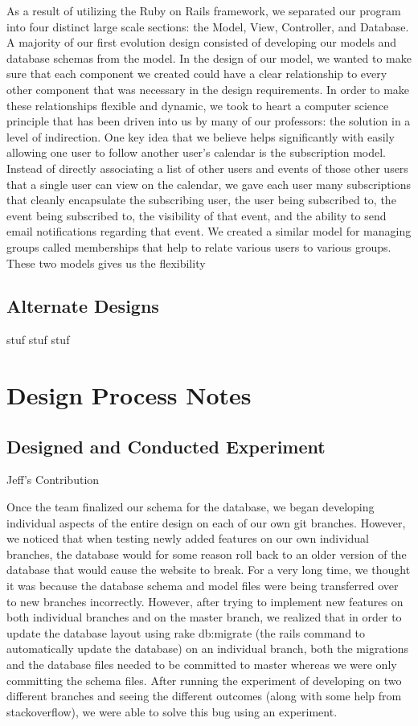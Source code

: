 \documentclass[11pt]{article}
\begin{document}
As a result of utilizing the Ruby on Rails framework, we separated our program into four distinct large scale sections: the Model, View, Controller, and Database.  A majority of our first evolution design consisted of developing our models and database schemas from the model.  In the design of our model, we wanted to make sure that each component we created could have a clear relationship to every other component that was necessary in the design requirements.  In order to make these relationships flexible and dynamic, we took to heart a computer science principle that has been driven into us by many of our professors: the solution in a level of indirection.  One key idea that we believe helps significantly with easily allowing one user to follow another user's calendar is the subscription model.  Instead of directly associating a list of other users and events of those other users that a single user can view on the calendar, we gave each user many subscriptions that cleanly encapsulate the subscribing user, the user being subscribed to, the event being subscribed to, the visibility of that event, and the ability to send email notifications regarding that event.  We created a similar model for managing groups called memberships that help to relate various users to various groups.  These two models gives us the flexibility 

\subsection{Alternate Designs}

stuf stuf stuf

\section{Design Process Notes}

\subsection{Designed and Conducted Experiment}

Jeff's Contribution

Once the team finalized our schema for the database, we began developing individual aspects of the entire design on each of our own git branches.  However, we noticed that when testing newly added features on our own individual branches, the database would for some reason roll back to an older version of the database that would cause the website to break.  For a very long time, we thought it was because the database schema and model files were being transferred over to new branches incorrectly.  However, after trying to implement new features on both individual branches and on the master branch, we realized that in order to update the database layout using rake db:migrate (the rails command to automatically update the database) on an individual branch, both the migrations and the database files needed to be committed to master whereas we were only committing the schema files.  After running the experiment of developing on two different branches and seeing the different outcomes (along with some help from stackoverflow), we were able to solve this bug using an experiment.
\end{document}
